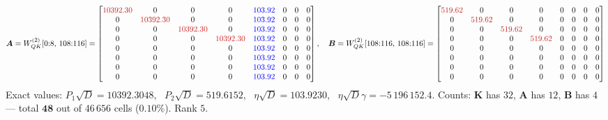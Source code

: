 \documentclass[11pt]{article}
\newcommand{\Wqk}{W_{QK}}
\newcommand{\sd}{\sqrt{D}}
\begin{document}
\begin{equation}
\bm{A}=\Wqk^{(2)}[0{:}8,\,108{:}116]=
\begin{bmatrix}
\textcolor{hl}{10392.30}&0&0&0&\textcolor{blue}{103.92}&0&0&0\\
0&\textcolor{hl}{10392.30}&0&0&\textcolor{blue}{103.92}&0&0&0\\
0&0&\textcolor{hl}{10392.30}&0&\textcolor{blue}{103.92}&0&0&0\\
0&0&0&\textcolor{hl}{10392.30}&\textcolor{blue}{103.92}&0&0&0\\
0&0&0&0&\textcolor{blue}{103.92}&0&0&0\\
0&0&0&0&\textcolor{blue}{103.92}&0&0&0\\
0&0&0&0&\textcolor{blue}{103.92}&0&0&0\\
0&0&0&0&\textcolor{blue}{103.92}&0&0&0
\end{bmatrix},
\quad
\bm{B}=\Wqk^{(2)}[108{:}116,\,108{:}116]=
\begin{bmatrix}
\textcolor{hl}{519.62}&0&0&0&0&0&0&0\\
0&\textcolor{hl}{519.62}&0&0&0&0&0&0\\
0&0&\textcolor{hl}{519.62}&0&0&0&0&0\\
0&0&0&\textcolor{hl}{519.62}&0&0&0&0\\
0&0&0&0&0&0&0&0\\
0&0&0&0&0&0&0&0\\
0&0&0&0&0&0&0&0\\
0&0&0&0&0&0&0&0
\end{bmatrix}
\end{equation}
Exact values: $P_1\sd=10392.3048$, \ $P_2\sd=519.6152$, \ $\eta\sd=103.9230$, \
$\eta\sd\gamma=-5\,196\,152.4$. Counts: $\bm{K}$ has $32$, $\bm{A}$ has $12$, $\bm{B}$ has $4$
--- total $\bm{48}$ out of $46\,656$ cells ($0.10\%$). Rank $5$.
\end{document}
